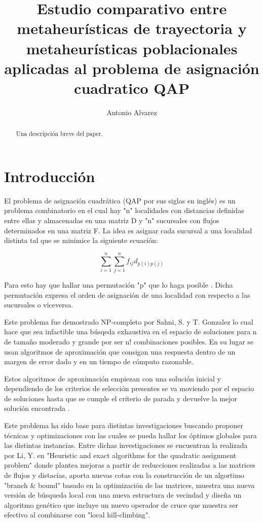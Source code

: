 \documentclass{ci5652}
\title{Estudio comparativo entre metaheurísticas de trayectoria y metaheurísticas poblacionales aplicadas al problema de asignación cuadratico QAP}
\author{Antonio Alvarez}
\begin{document}
\thispagestyle{empty}
\maketitle

\begin{abstract}
Una descripción breve del paper.
\end{abstract}

\section{Introducción}

El problema de asignación cuadrática (QAP por sus siglas en inglés) es un problema combinatorio en el cual hay "n" localidades con distancias definidas entre ellas y almacenadas en una matriz D y "n" sucursales con flujos determinados en una matriz F. La idea es asignar cada sucursal a una localidad distinta tal que se minimice la siguiente ecuación: 

\begin {equation*}
\sum_{i=1}^{n} \sum_{j=1}^{n} f_{ij} d_{p(i)p(j)}
\end {equation*}

Para esto hay que hallar una permutación "p"  que lo haga posible \cite{1}. Dicha permutación expresa el orden de asignación de una localidad con respecto a las sucursales o viceversa.

Este problema fue demostrado NP-completo por Sahni, S. y T. Gonzalez \cite{2} lo cual hace que sea infactible una búsqeda exhaustiva en el espacio de soluciones para n de tamaño moderado y grande por ser n! combinaciones posibles. En su lugar se usan algoritmos de aproximación que consigan una respuesta dentro de un margen de error dado y en un tiempo de cómputo razonable.

Estos algoritmos de aproximación empiezan con una solución inicial y dependiendo de los criterios de selección presentes se va moviendo por el espacio de soluciones hasta que se cumple el criterio de parada y devuelve la mejor solución encontrada \cite{4}.

Este problema ha sido base para distintas investigaciones buscando proponer técnicas y optimizaciones con las cuales se pueda hallar los óptimos globales para las distintas instancias. Entre dichas investigaciones se encuentran la realizada por Li, Y. en "Heuristic and exact algorithms for the quadratic assignment problem" \cite{12} donde plantea mejoras a partir de reducciones realizadas a las matrices de flujos y distacias, aporta nuevas cotas con la construcción de un algortimo "branch \& bound" basado en la optimización de las matrices, muestra una nueva versión de búsqueda local con una nueva estructura de vecindad y diseña un algoritmo genético que incluye un nuevo operador de cruce que muestra ser efectivo al combinarse con "local hill-climbing".
\end{document}
